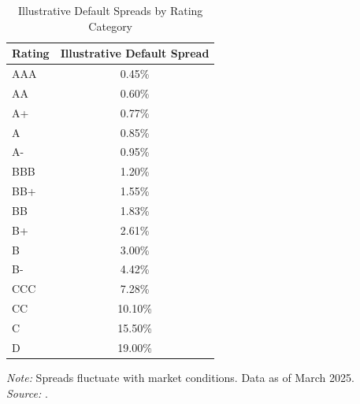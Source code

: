 \begin{enumerate}
          \begin{table}[H]
              \centering
              \caption{Illustrative Default Spreads by Rating Category}
              \label{tab:rating_default_spreads_example}
              \vspace{2mm}
              \begin{tabular}{|l|c|}
                  \hline
                  \textbf{Rating} & \textbf{Illustrative Default Spread} \\ \hline
                  AAA             & 0.45\%                               \\ \hline
                  AA              & 0.60\%                               \\ \hline
                  A+              & 0.77\%                               \\ \hline
                  A               & 0.85\%                               \\ \hline
                  A-              & 0.95\%                               \\ \hline
                  BBB             & 1.20\%                               \\ \hline
                  BB+             & 1.55\%                               \\ \hline
                  BB              & 1.83\%                               \\ \hline
                  B+              & 2.61\%                               \\ \hline
                  B               & 3.00\%                               \\ \hline
                  B-              & 4.42\%                               \\ \hline
                  CCC             & 7.28\%                               \\ \hline
                  CC              & 10.10\%                              \\ \hline
                  C               & 15.50\%                              \\ \hline
                  D               & 19.00\%                              \\ \hline
              \end{tabular}

              \vspace{2mm}
              \raggedright \footnotesize
              \textit{Note:} Spreads fluctuate with market conditions. Data as of March 2025.\\
              \textit{Source:} \textcite{damodaran_data_2025}.
          \end{table}


\end{enumerate}
